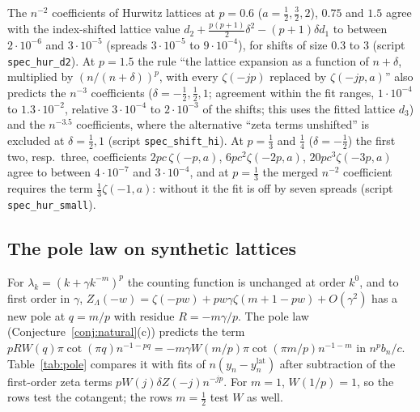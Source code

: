 The $n^{-2}$ coefficients of Hurwitz lattices at $p=0.6$ ($a=\frac12,\frac32,2$), $0.75$ and $1.5$ agree with the
index-shifted lattice value $d_2+\frac{p(p+1)}2\delta^2-(p+1)\delta d_1$ to between $2\cdot10^{-6}$ and $3\cdot10^{-5}$
(spreads $3\cdot10^{-5}$ to $9\cdot10^{-4}$), for shifts of size $0.3$ to $3$ (script \texttt{spec\_hur\_d2}). At $p=1.5$ the
rule ``the lattice expansion as a function of $n+\delta$, multiplied by $(n/(n+\delta))^p$, with every $\zeta(-jp)$ replaced by
$\zeta(-jp,a)$'' also predicts the $n^{-3}$ coefficients ($\delta=-\frac12,\frac12,1$; agreement within the fit ranges,
$1\cdot10^{-4}$ to $1.3\cdot10^{-2}$, relative $3\cdot10^{-4}$ to $2\cdot10^{-3}$ of the shifts; this uses the fitted lattice
$d_3$) and the $n^{-3.5}$ coefficients, where the alternative ``zeta terms unshifted'' is excluded at $\delta=\frac12,1$
(script \texttt{spec\_shift\_hi}). At $p=\frac13$ and $\frac14$ ($\delta=-\frac12$) the first two, resp.\ three, coefficients
$2pc\,\zeta(-p,a)$, $6pc^2\zeta(-2p,a)$, $20pc^3\zeta(-3p,a)$ agree to between $4\cdot10^{-7}$ and $3\cdot10^{-4}$, and at
$p=\frac13$ the merged $n^{-2}$ coefficient requires the term $\frac13\zeta(-1,a)$: without it the fit is off by seven
spreads (script \texttt{spec\_hur\_small}).

\subsection{The pole law on synthetic lattices}\label{sec:num-pole}
For $\lambda_k=(k+\gamma k^{-m})^p$ the counting function is unchanged at order $k^0$, and to first order in $\gamma$,
$Z_\Lambda(-w)=\zeta(-pw)+pw\gamma\zeta(m+1-pw)+O(\gamma^2)$ has a new pole at $q=m/p$ with residue $R=-m\gamma/p$. The pole
law (Conjecture~\ref{conj:natural}(c)) predicts the term $pRW(q)\pi\cot(\pi q)n^{-1-pq}=-m\gamma W(m/p)\pi\cot(\pi m/p)n^{-1-m}$ in
$n^pb_n/c$. Table~\ref{tab:pole} compares it with fits of $n(y_n-y_n^{\mathrm{lat}})$ after subtraction of the first-order
zeta terms $pW(j)\delta Z(-j)n^{-jp}$. For $m=1$, $W(1/p)=1$, so the rows test the cotangent; the rows $m=\frac12$ test
$W$ as well.

